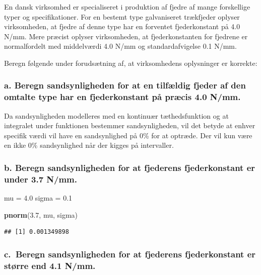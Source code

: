 \documentclass[
]{article}
\newenvironment{Shaded}{\begin{snugshade}}{\end{snugshade}}
\newcommand{\FloatTok}[1]{\textcolor[rgb]{0.00,0.00,0.81}{#1}}
\newcommand{\FunctionTok}[1]{\textcolor[rgb]{0.13,0.29,0.53}{\textbf{#1}}}
\newcommand{\NormalTok}[1]{#1}
\newcommand{\OtherTok}[1]{\textcolor[rgb]{0.56,0.35,0.01}{#1}}
\begin{document}
En dansk virksomhed er specialiseret i produktion af fjedre af mange
forskellige typer og specifikationer. For en bestemt type galvaniseret
trækfjeder oplyser virksomheden, at fjedre af denne type har en
forventet fjederkonstant på 4.0 N/mm. Mere præcist oplyser virksomheden,
at fjederkonstanten for fjedrene er normalfordelt med middelværdi 4.0
N/mm og standardafvigelse 0.1 N/mm.

Beregn følgende under forudsætning af, at virksomhedens oplysninger er
korrekte:

\subsubsection{a. Beregn sandsynligheden for at en tilfældig fjeder af
den omtalte type har en fjederkonstant på præcis 4.0
N/mm.}\label{a.-beregn-sandsynligheden-for-at-en-tilfuxe6ldig-fjeder-af-den-omtalte-type-har-en-fjederkonstant-puxe5-pruxe6cis-4.0-nmm.}

Da sandsynligheden modelleres med en kontinuær tæthedsfunktion og at
integralet under funktionen bestemmer sandsynligheden, vil det betyde at
enhver specifik værdi vil have en sandsynlighed på 0\% for at optræde.
Der vil kun være en ikke 0\% sandsynlighed når der kigges på
intervaller.

\subsubsection{b. Beregn sandsynligheden for at fjederens fjederkonstant
er under 3.7
N/mm.}\label{b.-beregn-sandsynligheden-for-at-fjederens-fjederkonstant-er-under-3.7-nmm.}

\begin{Shaded}
\begin{Highlighting}[]
\NormalTok{mu }\OtherTok{=} \FloatTok{4.0}
\NormalTok{sigma }\OtherTok{=} \FloatTok{0.1}

\FunctionTok{pnorm}\NormalTok{(}\FloatTok{3.7}\NormalTok{, mu, sigma)}
\end{Highlighting}
\end{Shaded}

\begin{verbatim}
## [1] 0.001349898
\end{verbatim}

\subsubsection{c.~Beregn sandsynligheden for at fjederens fjederkonstant
er større end 4.1
N/mm.}\label{c.-beregn-sandsynligheden-for-at-fjederens-fjederkonstant-er-stuxf8rre-end-4.1-nmm.}
\end{document}
